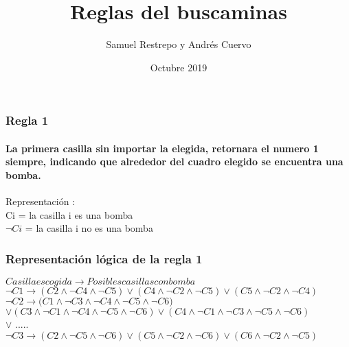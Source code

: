 \documentclass{beamer}
\title{Reglas del buscaminas}
\author{Samuel Restrepo y Andrés Cuervo}
\date{Octubre 2019}
\begin{document}
\begin{frame}
\titlepage
\end{frame}

\begin{frame}
\frametitle{Regla 1}
\framesubtitle{La primera casilla sin importar la elegida, retornara el numero 1 siempre, indicando que alrededor del cuadro elegido se encuentra una bomba.
}

Representación :\\
Ci = la casilla i es una bomba\\
$\neg{Ci}$ = la casilla i no es una bomba\\

\end{frame}

\begin{frame}
\frametitle{Representación lógica de la regla 1}
$Casilla escogida \rightarrow   {Posibles casillas con bomba}$\\
$\neg{C1} \rightarrow{(C2 \wedge{\neg{C4}} \wedge{\neg{C5}})\lor{(C4 \wedge{\neg{C2}} \wedge{\neg{C5}})}\lor{(C5 \wedge{\neg{C2}} \wedge{\neg{C4}})}}$\\
$\neg{C2} \rightarrow{(C1 \wedge{\neg{C3}} \wedge{\neg{C4}} \wedge{\neg{C5}} \wedge{\neg{C6}}})$\\
$\lor{(C3 \wedge{\neg{C1}} \wedge{\neg{C4}} \wedge{\neg{C5}}\wedge{\neg{C6}})}\lor{(C4 \wedge{\neg{C1}} \wedge{\neg{C3}} \wedge{\neg{C5}} \wedge{\neg{C6}})}$ \\
$\lor{}$ .....\\
$\neg{C3} \rightarrow{(C2 \wedge{\neg{C5}} \wedge{\neg{C6}})\lor{(C5 \wedge{\neg{C2}} \wedge{\neg{C6}})}\lor{(C6 \wedge{\neg{C2}} \wedge{\neg{C5}})}}$\\



\end{frame}
\end{document}
